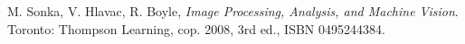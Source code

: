 \begin{thebibliography}{9}

	M. Sonka, V. Hlavac, R. Boyle,
	\emph{Image Processing, Analysis, and Machine Vision}.\\
	Toronto: Thompson Learning,
	cop. 2008, 3rd ed.,
	ISBN 0495244384.


\end{thebibliography}